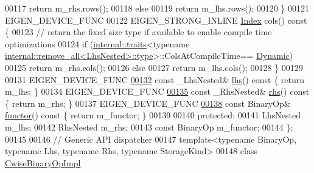 \begin{DoxyCode}
00117         \textcolor{keywordflow}{return} m\_rhs.rows();
00118       \textcolor{keywordflow}{else}
00119         \textcolor{keywordflow}{return} m\_lhs.rows();
00120     \}
00121     EIGEN\_DEVICE\_FUNC
00122     EIGEN\_STRONG\_INLINE \hyperlink{namespace_eigen_a62e77e0933482dafde8fe197d9a2cfde}{Index} cols()\textcolor{keyword}{ const }\{
00123       \textcolor{comment}{// return the fixed size type if available to enable compile time optimizations}
00124       \textcolor{keywordflow}{if} (\hyperlink{struct_eigen_1_1internal_1_1traits}{internal::traits}<\textcolor{keyword}{typename} 
      \hyperlink{group___sparse_core___module}{internal::remove\_all<LhsNested>::type}>::ColsAtCompileTime==
      \hyperlink{namespace_eigen_ad81fa7195215a0ce30017dfac309f0b2}{Dynamic})
00125         \textcolor{keywordflow}{return} m\_rhs.cols();
00126       \textcolor{keywordflow}{else}
00127         \textcolor{keywordflow}{return} m\_lhs.cols();
00128     \}
00129 
00131     EIGEN\_DEVICE\_FUNC
\hyperlink{group___core___module_a0f73e7585dfb54d41c1983e1e6a4b269}{00132}     \textcolor{keyword}{const} \_LhsNested& \hyperlink{group___core___module_a0f73e7585dfb54d41c1983e1e6a4b269}{lhs}()\textcolor{keyword}{ const }\{ \textcolor{keywordflow}{return} m\_lhs; \}
00134     EIGEN\_DEVICE\_FUNC
\hyperlink{group___core___module_a3a61cbdf6d1adaa62f012045b04b6d09}{00135}     \textcolor{keyword}{const} \_RhsNested& \hyperlink{group___core___module_a3a61cbdf6d1adaa62f012045b04b6d09}{rhs}()\textcolor{keyword}{ const }\{ \textcolor{keywordflow}{return} m\_rhs; \}
00137     EIGEN\_DEVICE\_FUNC
\hyperlink{group___core___module_acc4efe306adbdc0c95cc1c73a8cf81e4}{00138}     \textcolor{keyword}{const} BinaryOp& \hyperlink{group___core___module_acc4efe306adbdc0c95cc1c73a8cf81e4}{functor}()\textcolor{keyword}{ const }\{ \textcolor{keywordflow}{return} m\_functor; \}
00139 
00140   \textcolor{keyword}{protected}:
00141     LhsNested m\_lhs;
00142     RhsNested m\_rhs;
00143     \textcolor{keyword}{const} BinaryOp m\_functor;
00144 \};
00145 
00146 \textcolor{comment}{// Generic API dispatcher}
00147 \textcolor{keyword}{template}<\textcolor{keyword}{typename} BinaryOp, \textcolor{keyword}{typename} Lhs, \textcolor{keyword}{typename} Rhs, \textcolor{keyword}{typename} StorageKind>
00148 \textcolor{keyword}{class }\hyperlink{class_eigen_1_1_cwise_binary_op_impl}{CwiseBinaryOpImpl}

\end{DoxyCode}
